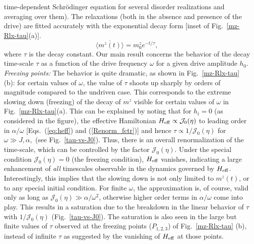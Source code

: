 \documentclass[reprint,preprintnumbers,showpacs,amsmath,twocolumn,showkeys,aps,prl]{revtex4-1}
\begin{document}
time-dependent Schr\"{o}dinger equation for several disorder realizations and averaging 
over them). The relaxations (both in the absence and presence of the drive) 
are fitted accurately with the exponential decay form 
[inset of Fig.~\ref{mz-Rlx-tau}(a)].
\begin{equation}
\overline{\langle m^{z}(t)\rangle} =  m^{z}_{0}e^{-t/\tau},
\label{Exp-decay-fit}
\end{equation} 
\noindent
where $\tau$ is the decay constant. Our main result concerns the behavior of the decay time-scale $\tau$ 
as a function of the drive frequency $\omega$ for a given drive amplitude $h_{0}$. \\

\noindent
{\it Freezing points:}
The behavior is quite dramatic, as shown in Fig.~\ref{mz-Rlx-tau}(b):
for certain values of $\omega$, the value of $\tau$ shoots up sharply 
by orders of magnitude compared to the undriven case. This corresponds 
to the extreme slowing down (freezing) of the decay of $m^z$ visible for certain 
values of $\omega$ in Fig.~\ref{mz-Rlx-tau}(a).
This can be explained by noting that for $h_{i}=0$ (as considered in the figure), 
the effective Hamiltonian  $H_{\rm eff} \propto {\mathcal J}_{0}(\eta)$ to leading order in $\alpha/\omega$ 
[Eqs.~(\ref{eq:heff}) and (\ref{Renorm_fctr})] and hence $\tau \propto 1/{\mathcal J}_{0}(\eta)$ for $\omega \gg J,\alpha,$ (see Fig.~\ref{tau-vs-J0}). Thus, there is an overall renormalization of the time-scale, which can be controlled
by the factor ${\mathcal J}_{0}(\eta).$ Under the special condition ${\mathcal J}_{0}(\eta)=0$ (the freezing condition), $H_{\rm eff}$ 
vanishes, indicating a large enhancement of {\it all} timescales observable in the dynamics governed by $H_{\rm eff}$.
Interestingly, this implies that the slowing down is not only limited to $m^z(t)$, 
or to any special initial condition. 
For finite $\omega$, the approximation is, of course, valid only as long as 
${\mathcal J}_{0}(\eta) \gg \alpha/\omega^{2}$, otherwise higher order terms in $\alpha/\omega$ 
come into play. This results in a saturation due to the breakdown in the linear behavior of $\tau$ with $1/{\mathcal J}_{0}(\eta)$ (Fig.~\ref{tau-vs-J0}). The saturation is also seen in the large but finite values of $\tau$ observed
at the freezing points ($P_{1,2,3}$) of Fig.~\ref{mz-Rlx-tau} (b), instead of infinite $\tau$ as suggested by 
the vanishing of $H_{\rm eff}$ at those points.    \\
\end{document}
